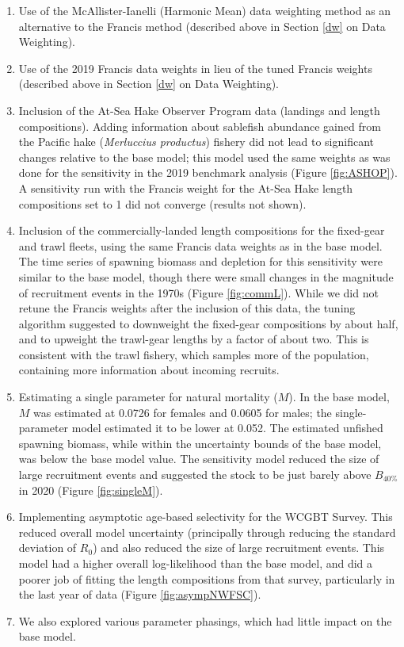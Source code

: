 \documentclass[11pt,
  english,
  a4paper,
]{article}
\begin{document}
\begin{enumerate}
\item Use of the McAllister-Ianelli (Harmonic Mean) data weighting method as an alternative to the Francis method (described above in Section \ref{dw} on Data Weighting).
\item Use of the 2019 Francis data weights in lieu of the tuned Francis weights (described above in Section \ref{dw} on Data Weighting).
\item Inclusion of the At-Sea Hake Observer Program data (landings and length compositions). Adding information about sablefish abundance gained from the Pacific hake (\emph{Merluccius productus}) fishery did not lead to significant changes relative to the base model; this model used the same weights as was done for the sensitivity in the 2019 benchmark analysis (Figure \ref{fig:ASHOP}). A sensitivity run with the Francis weight for the At-Sea Hake length compositions set to 1 did not converge (results not shown).
\item Inclusion of the commercially-landed length compositions for the fixed-gear and trawl fleets, using the same Francis data weights as in the base model. The time series of spawning biomass and depletion for this sensitivity were similar to the base model, though there were small changes in the magnitude of recruitment events in the 1970s (Figure \ref{fig:commL}). While we did not retune the Francis weights after the inclusion of this data, the tuning algorithm suggested to downweight the fixed-gear compositions by about half, and to upweight the trawl-gear lengths by a factor of about two. This is consistent with the trawl fishery, which samples more of the population, containing more information about incoming recruits.
\item Estimating a single parameter for natural mortality ($M$).  In the base model, $M$ was estimated at 0.0726 for females and 0.0605 for males; the single-parameter model estimated it to be lower at 0.052. The estimated unfished spawning biomass, while within the uncertainty bounds of the base model, was below the base model value. The sensitivity model reduced the size of large recruitment events and suggested the stock to be just barely above $B_{40\%}$ in 2020 (Figure \ref{fig:singleM}).
\item Implementing asymptotic age-based selectivity for the WCGBT Survey. This reduced overall model uncertainty (principally through reducing the standard deviation of $R_0$) and also reduced the size of large recruitment events.  This model had a higher overall log-likelihood than the base model, and did a poorer job of fitting the length compositions from that survey, particularly in the last year of data (Figure \ref{fig:asympNWFSC}).
\item We also explored various parameter phasings, which had little impact on the base model.
\end{enumerate}
\end{document}

